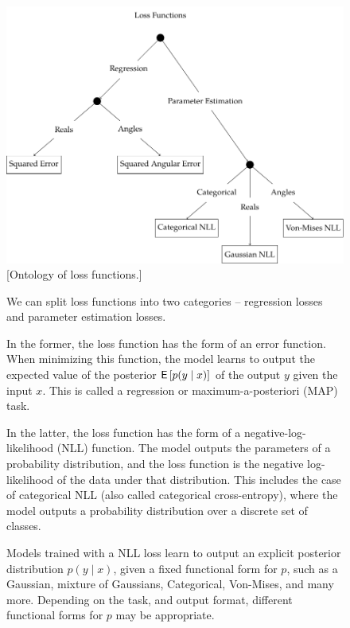 \begin{figure}[h]
    \centering
        \includegraphics[width=.7\linewidth]{figures/ontology-1-loss.pdf}
        \vspace{1cm}
        \captionsetup{parskip=7pt}
        [Ontology of loss functions.]{We can split loss functions into two categories -- regression losses and parameter estimation losses.

        In the former, the loss function has the form of an error function. When minimizing this function, the model learns to output the expected value of the posterior $\mathsf{E}\left[p(y \mid x)\right]$ of the output $y$ given the input $x$. This is called a regression or maximum-a-posteriori (MAP) task.

        In the latter, the loss function has the form of a negative-log-likelihood (NLL) function. The model outputs the parameters of a probability distribution, and the loss function is the negative log-likelihood of the data under that distribution. This includes the case of categorical NLL (also called categorical cross-entropy), where the model outputs a probability distribution over a discrete set of classes.

        Models trained with a NLL loss learn to output an explicit posterior distribution $p(y \mid x)$, given a fixed functional form for $p$, such as a Gaussian, mixture of Gaussians, Categorical, Von-Mises, and many more. Depending on the task, and output format, different functional forms for $p$ may be appropriate.}
        \label{fig:ontology-loss}
\end{figure}

